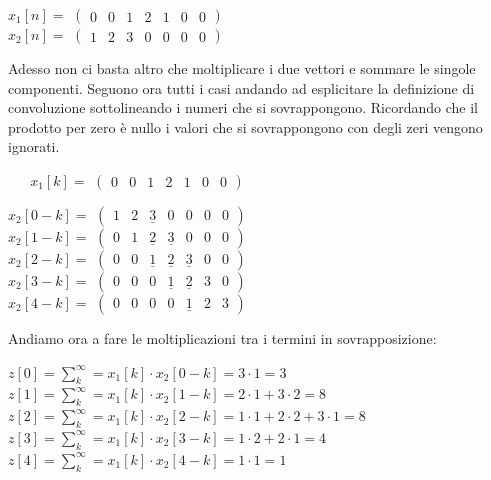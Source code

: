\documentclass[../main.tex]{subfiles}
\begin{document}
\begin{center}
$x_1[n] = $
$\begin{pmatrix}
	0&0&1&2&1&0&0
\end{pmatrix}$	\\
$x_2[n] = $
$\begin{pmatrix}
	1&2&3&0&0&0&0
\end{pmatrix}$	
\end{center}

Adesso non ci basta altro che moltiplicare i due vettori e sommare le singole componenti.
Seguono ora tutti i casi andando ad esplicitare la definizione di convoluzione sottolineando i numeri che si sovrappongono. Ricordando che il prodotto per zero è nullo i valori che si sovrappongono con degli zeri vengono ignorati.

\begin{center}
$\hspace{19pt} x_1[k] = $ 
$\begin{pmatrix}
	0&0&1&2&1&0&0
\end{pmatrix}$	
\end{center}

\begin{center}
$x_2[0-k] = $
$\begin{pmatrix}
	1&2&\underline{3}&0&0&0&0
\end{pmatrix}$	\\
$x_2[1-k] = $
$\begin{pmatrix}
	0&1&\underline{2}&\underline{3}&0&0&0
\end{pmatrix}$	\\
$x_2[2-k] = $
$\begin{pmatrix}
	0&0&\underline{1}&\underline{2}&\underline{3}&0&0
\end{pmatrix}$	\\
$x_2[3-k] = $
$\begin{pmatrix}
	0&0&0&\underline{1}&\underline{2}&3&0
\end{pmatrix}$	\\
$x_2[4-k] = $
$\begin{pmatrix}
	0&0&0&0&\underline{1}&2&3
\end{pmatrix}$	

\end{center}

Andiamo ora a fare le moltiplicazioni tra i termini in sovrapposizione:

\begin{center}
	$z[0] = \sum_k^{\infty} = x_1[k] \cdot x_2[0-k] =  3 \cdot 1 = 3$\\
	$z[1] = \sum_k^{\infty} = x_1[k] \cdot x_2[1-k] =  2 \cdot 1 + 3 \cdot 2 = 8$\\
	$z[2] = \sum_k^{\infty} = x_1[k] \cdot x_2[2-k] =  1 \cdot 1 + 2 \cdot 2 + 3 \cdot 1 = 8$\\
	$z[3] = \sum_k^{\infty} = x_1[k] \cdot x_2[3-k] =  1 \cdot 2 + 2 \cdot 1 = 4$\\
	$z[4] = \sum_k^{\infty} = x_1[k] \cdot x_2[4-k] =  1 \cdot 1 = 1$
	
\end{center}
\end{document}
